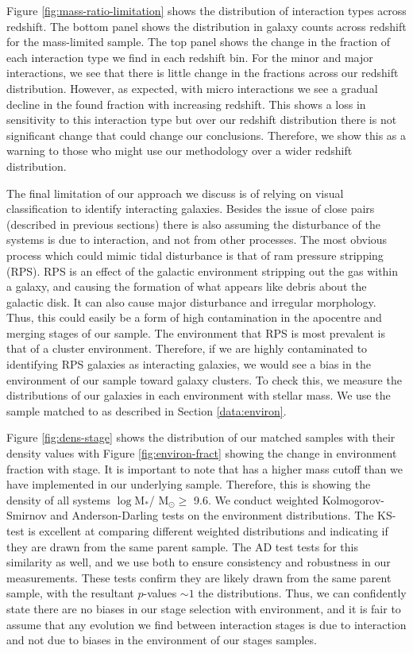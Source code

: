 Figure \ref{fig:mass-ratio-limitation} shows the distribution of interaction types across redshift. The bottom panel shows the distribution in galaxy counts across redshift for the mass-limited sample. The top panel shows the change in the fraction of each interaction type we find in each redshift bin. For the minor and major interactions, we see that there is little change in the fractions across our redshift distribution. However, as expected, with micro interactions we see a gradual decline in the found fraction with increasing redshift. This shows a loss in sensitivity to this interaction type but over our redshift distribution there is not significant change that could change our conclusions. Therefore, we show this as a warning to those who might use our methodology over a wider redshift distribution.

The final limitation of our approach we discuss is of relying on visual classification to identify interacting galaxies. Besides the issue of close pairs (described in previous sections) there is also assuming the disturbance of the systems is due to interaction, and not from other processes. The most obvious process which could mimic tidal disturbance is that of ram pressure stripping (RPS). RPS is an effect of the galactic environment stripping out the gas within a galaxy, and causing the formation of what appears like debris about the galactic disk. It can also cause major disturbance and irregular morphology. Thus, this could easily be a form of high contamination in the apocentre and merging stages of our sample. The environment that RPS is most prevalent is that of a cluster environment. Therefore, if we are highly contaminated to identifying RPS galaxies as interacting galaxies, we would see a bias in the environment of our sample toward galaxy clusters. To check this, we measure the distributions of our galaxies in each environment with stellar mass. We use the sample matched to \citet{2017ApJ...837...16D} as described in Section \ref{data:environ}.

Figure \ref{fig:dens-stage} shows the distribution of our matched samples with their density values with Figure \ref{fig:environ-fract} showing the change in environment fraction with stage. It is important to note that \citet{2017ApJ...837...16D} has a higher mass cutoff than we have implemented in our underlying sample. Therefore, this is showing the density of all systems $\log$M$_*$/ M$_\odot \geq$ 9.6. We conduct weighted Kolmogorov-Smirnov \citep[KS-test;][]{an1933sulla} and Anderson-Darling \citep[AD-test;][]{stephens_74} tests on the environment distributions. The KS-test is excellent at comparing different weighted distributions and indicating if they are drawn from the same parent sample. The AD test tests for this similarity as well, and we use both to ensure consistency and robustness in our measurements. These tests confirm they are likely drawn from the same parent sample, with the resultant $p$-values $\sim1$ the distributions. Thus, we can confidently state there are no biases in our stage selection with environment, and it is fair to assume that any evolution we find between interaction stages is due to interaction and not due to biases in the environment of our stages samples.

